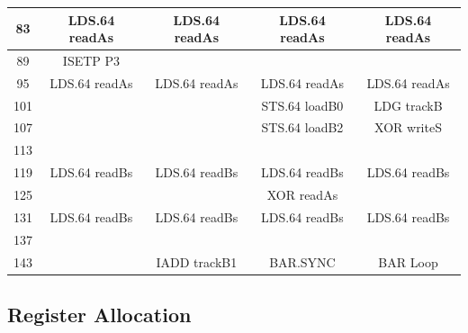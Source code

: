 \documentclass{sig-alternate-05-2015}
\begin{document}
\begin{table}[!t]
{\begin{tabular}{|c|c|c|c|c|}
    \hline
    83 & LDS.64 readAs & LDS.64 readAs & LDS.64 readAs & LDS.64 readAs \\
    \hline
    89 &ISETP P3 & & &\\
    \hline
    95 & LDS.64 readAs & LDS.64 readAs & LDS.64 readAs & LDS.64 readAs \\
    \hline
    101 & & & STS.64 loadB0 & LDG trackB \\
    \hline
    107 & & & STS.64 loadB2 & XOR writeS \\
    \hline
    113 & & & & \\
    \hline
    119 & LDS.64 readBs & LDS.64 readBs & LDS.64 readBs & LDS.64 readBs \\
    \hline
    125 & & & XOR readAs & \\
    \hline
    131 & LDS.64 readBs & LDS.64 readBs & LDS.64 readBs & LDS.64 readBs \\
    \hline
    137 & & & & \\
    \hline
    143 & & IADD trackB1 & BAR.SYNC & BAR Loop \\
    \hline
\end{tabular}
}

\end{table}

\subsection{Register Allocation}
\end{document}
